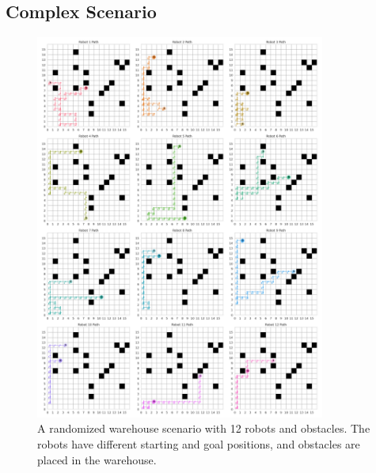 \documentclass[8pt]{article}
\begin{document}
\subsection{Complex Scenario}
\begin{figure}[H]
    \centering
    \includegraphics[width=0.85\textwidth]{figures/randomized_warehouse.png}
    \caption{A randomized warehouse scenario with 12 robots and obstacles. The robots have different starting and goal positions, and obstacles are placed in the warehouse.}
    \label{fig:randomized_warehouse}
\end{figure}
\end{document}
